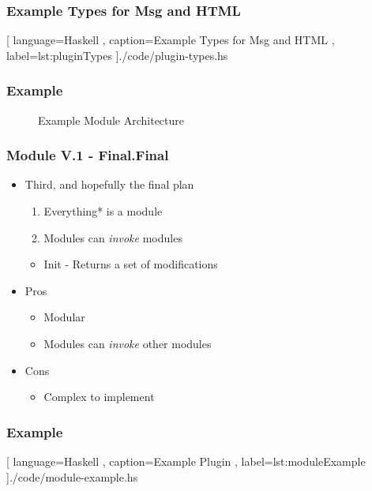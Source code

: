 \begin{frame}
  \frametitle{Example Types for Msg and HTML}
    \begin{center}
      
      [ language=Haskell
      , caption={Example Types for Msg and HTML}
      , label=lst:pluginTypes
      ]{./code/plugin-types.hs}
    \end{center}
\end{frame}

\hidelogo
\begin{frame}
  \frametitle{Example}
  \begin{figure}
    \centering
    
    \caption{Example Module Architecture}
    \label{fig:moduleArchitecture}
  \end{figure}
\end{frame}

\showlogo
\begin{frame}
  \frametitle{Module V.1 - Final.Final}
  \begin{itemize}
    \item Third, and hopefully the final plan
      \pause
      \begin{enumerate}
        \item Everything* is a module
          \pause
        \item Modules can \textit{invoke} modules
          \pause
      \end{enumerate}
      \begin{itemize}
        \item Init - Returns a set of modifications
      \end{itemize}
      \pause
    \item Pros
      \pause
      \begin{itemize}
        \item Modular
          \pause
        \item Modules can \textit{invoke} other modules
      \end{itemize}
      \pause
    \item Cons
      \begin{itemize}
          \pause
        \item Complex to implement
      \end{itemize}
  \end{itemize}
\end{frame}

\begin{frame}
  \frametitle{Example}
  \begin{center}
    
    [ language=Haskell
    , caption={Example Plugin}
    , label=lst:moduleExample
    ]{./code/module-example.hs}
  \end{center}
\end{frame}


